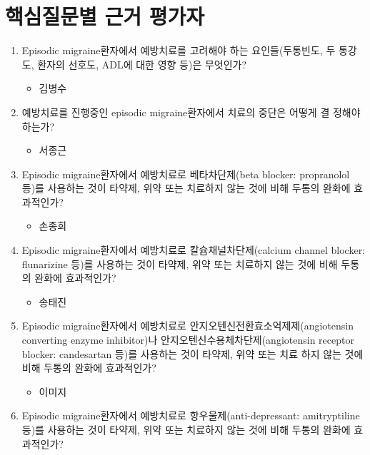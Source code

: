 \documentclass[]{book}
\providecommand{\tightlist}{%
  \setlength{\itemsep}{0pt}\setlength{\parskip}{0pt}}
\begin{document}
\hypertarget{section-19}{%
\section{핵심질문별 근거 평가자}\label{section-19}}

\begin{enumerate}
\def\labelenumi{\arabic{enumi}.}
\item
  Episodic migraine환자에서 예방치료를 고려해야 하는 요인들(두통빈도, 두 통강도, 환자의 선호도, ADL에 대한 영향 등)은 무엇인가?

  \begin{itemize}
  \tightlist
  \item
    김병수
  \end{itemize}
\item
  예방치료를 진행중인 episodic migraine환자에서 치료의 중단은 어떻게 결 정해야 하는가?

  \begin{itemize}
  \tightlist
  \item
    서종근
  \end{itemize}
\item
  Episodic migraine환자에서 예방치료로 베타차단제(beta blocker: propranolol 등)를 사용하는 것이 타약제, 위약 또는 치료하지 않는 것에 비해 두통의 완화에 효과적인가?

  \begin{itemize}
  \tightlist
  \item
    손종희
  \end{itemize}
\item
  Episodic migraine환자에서 예방치료로 칼슘채널차단제(calcium channel blocker: flunarizine 등)를 사용하는 것이 타약제, 위약 또는 치료하지 않는 것에 비해 두통의 완화에 효과적인가?

  \begin{itemize}
  \tightlist
  \item
    송태진
  \end{itemize}
\item
  Episodic migraine환자에서 예방치료로 안지오텐신전환효소억제제(angiotensin converting enzyme inhibitor)나 안지오텐신수용체차단제(angiotensin receptor blocker: candesartan 등)를 사용하는 것이 타약제, 위약 또는 치료 하지 않는 것에 비해 두통의 완화에 효과적인가?

  \begin{itemize}
  \tightlist
  \item
    이미지
  \end{itemize}
\item
  Episodic migraine환자에서 예방치료로 항우울제(anti-depressant: amitryptiline 등)를 사용하는 것이 타약제, 위약 또는 치료하지 않는 것에 비해 두통의 완화에 효과적인가?


\end{enumerate}
\end{document}
